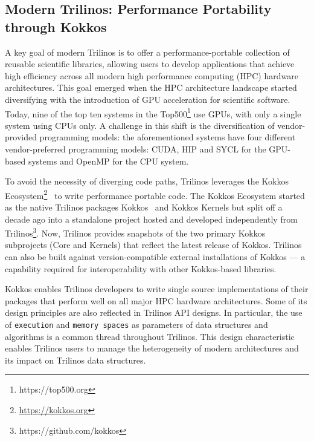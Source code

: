 \subsection{Modern Trilinos:  Performance Portability through Kokkos}


A key goal of modern Trilinos is to offer a performance-portable collection of reusable scientific libraries, allowing users to develop applications that achieve high efficiency across all modern high performance computing (HPC) hardware architectures.
This goal emerged when the HPC architecture landscape started diversifying with the
introduction of GPU acceleration for scientific software. Today, nine of the top ten systems in the Top500\footnote{https://top500.org} use GPUs, with only a single system using CPUs only. A challenge in this shift is the diversification of vendor-provided programming models: the aforementioned systems have four different vendor-preferred programming models: CUDA, HIP and SYCL for the GPU-based systems and OpenMP for the CPU system.

To avoid the necessity of diverging code paths, Trilinos leverages the Kokkos Ecosystem\footnote{\url{https://kokkos.org}}~\cite{trott2021kokkos} to write performance portable code. The Kokkos Ecosystem started as the native Trilinos packages Kokkos~\cite{heroux2011toward} and Kokkos Kernels but split off a decade ago into a standalone project hosted and developed independently from Trilinos\footnote{https://github.com/kokkos}.
Now, Trilinos provides snapshots of the two primary Kokkos subprojects (Core and Kernels) that reflect the latest release of Kokkos. Trilinos can also be built against version-compatible external installations of Kokkos --- a capability required for interoperability with other Kokkos-based libraries.

Kokkos enables Trilinos developers to write single source implementations of their packages that perform well on all major HPC hardware architectures. Some of its design principles are also reflected in Trilinos API designs. In particular, the
use of \texttt{execution} and \texttt{memory spaces} as parameters of data structures and algorithms is a common thread throughout Trilinos. This design characteristic enables Trilinos users to manage the heterogeneity of modern architectures and its impact on Trilinos data structures.


